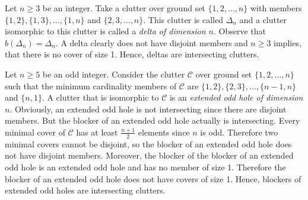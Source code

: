 \documentclass[a4paper, 12pt, twoside=false]{scrbook}
\theoremstyle{definition}
\begin{document}
    \begin{figure}[b]
        \centering
        \begin{minipage}{.4\textwidth}
            \centering
        \end{minipage}
        \begin{minipage}{.4\textwidth}
            \centering
        \end{minipage}
    \end{figure}


Let $n \geq 3$ be an integer.
Take a clutter over ground set $\{1,2,\ldots,n\}$ with members $\{1,2\},\{1,3\},\ldots,\{1,n\}$ and $\{2,3,\ldots,n\}$.
This clutter is called $\Delta_n$ and a clutter isomorphic to this clutter is called a \emph{delta of dimension $n$}\cite{deltadefinition}.
Observe that $b(\Delta_n)=\Delta_n$.
A delta clearly does not have disjoint members and $n\geq 3$ implies, that there is no cover of size 1.
Hence, deltas are intersecting clutters.

Let $n\geq 5$ be an odd integer.
Consider the clutter $\mathcal{C}$ over ground set $\{1,2,\ldots,n\}$ such that the minimum cardinality members of $\mathcal{C}$ are $\{1,2\},\{2,3\},\ldots,\{n-1,n\}$ and $\{n,1\}$.
A clutter that is isomorphic to $\mathcal{C}$ is an \emph{extended odd hole of dimension $n$}\cite{deltas}.
Obviously, an extended odd hole is not intersecting since there are disjoint members.
But the blocker of an extended odd hole actually is intersecting.
Every minimal cover of $\mathcal{C}$ has at least $\frac{n+1}2$ elements since $n$ is odd.
Therefore two minimal covers cannot be disjoint, so the blocker of an extended odd hole does not have disjoint members.
Moreover, the blocker of the blocker of an extended odd hole is an extended odd hole and has no member of size 1.
Therefore the blocker of an extended odd hole does not have covers of size 1.
Hence, blockers of extended odd holes are intersecting clutters.
\newline
\end{document}
